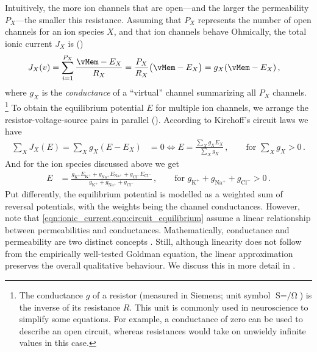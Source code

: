 Intuitively, the more ion channels that are open---and the larger the permeability $P_X$---the smaller this resistance.
Assuming that $P_X$ represents the number of open channels for an ion species $X$, and that ion channels behave Ohmically, the total ionic current $J_X$ is  ()
\begin{align}
	J_X(v) &= \sum_{i = 1}^{P_X} \frac{\vMem - E_X}{R_X} = \frac{P_X}{R_X} \bigl( \vMem - E_X \bigr) = g_X (\vMem - E_X)\,,
	\label{eqn:ionic_current}
\end{align}
where $g_X$ is the \emph{conductance} of a \enquote{virtual} channel summarizing all $P_X$ channels.%
\footnote{The conductance $g$ of a resistor (measured in Siemens; unit symbol $\si{\siemens} = \si{\per\ohm}$) is the inverse of its resistance $R$.
This unit is commonly used in neuroscience to simplify some equations.
For example, a conductance of zero can be used to describe an open circuit, whereas resistances would take on unwieldy infinite values in this case.}
To obtain the equilibrium potential $E$ for multiple ion channels, we arrange the resistor-voltage-source pairs in parallel ().
According to Kirchoff's circuit laws we have
\begin{align}
	\sum_X J_X(E) = \sum_X g_X (E - E_X) &= 0 \Leftrightarrow E = \frac{\sum_X g_X E_X}{\sum_X g_X} \,, \quad \quad \text{for } \sum_X g_X > 0 \,.
	\label{eqn:circuit_equilibrium}
\end{align}
And for the ion species discussed above we get
\begin{align}
	E &= \frac{g_\mathrm{K^+} E_\mathrm{K^+} + g_\mathrm{Na^+} E_\mathrm{Na^+} + g_\mathrm{Cl^-} E_\mathrm{Cl^-}}{g_\mathrm{K^+} + g_\mathrm{Na^+} + g_\mathrm{Cl^-}} \,,  \quad \quad \text{for } g_\mathrm{K^+} + g_\mathrm{Na^+} + g_\mathrm{Cl^-} > 0 \,.
	\label{eqn:circuit_equilibrium_ions}
\end{align}
Put differently, the equilibrium potential is modelled as a weighted sum of reversal potentials, with the weights being the channel conductances.
However, note that \cref{eqn:ionic_current,eqn:circuit_equilibrium} assume a linear relationship between permeabilities and conductances.
Mathematically, conductance and permeability are two distinct concepts \citep{enderle2011bioelectric}.
Still, although linearity does not follow from the empirically well-tested Goldman equation, the linear approximation preserves the overall qualitative behaviour. We discuss this in more detail in .

